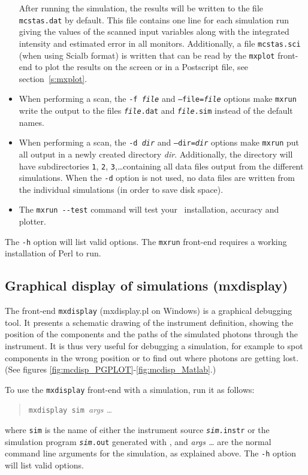 \begin{itemize}
After running the simulation, the results will be written to the file
\verb+mcstas.dat+ by default. This file contains one line for each
simulation run giving the values of the scanned input variables along
with the integrated intensity and estimated error in all monitors. Additionally, a
file \verb+mcstas.sci+ (when using Scialb format) is written that can be read by the \verb+mxplot+
front-end to plot the results on the screen or in a Postscript file, see
section~\ref{s:mxplot}. 
\item When performing a scan, the \texttt{-f \textit{file}} and
  \texttt{--file=\textit{file}} options make \verb+mxrun+ write the output
  to the files \texttt{\textit{file\/}.dat} and \texttt{\textit{file\/}.sim}
  instead of the default names.
\item When performing a scan, the \texttt{-d \textit{dir}} and
  \texttt{--dir=\textit{dir}} options make \verb+mxrun+ put all output in a
  newly created directory \textit{dir}. Additionally, the directory will
  have subdirectories \verb+1+, \verb+2+, \verb+3+,\ldots containing all
  data files output from the different simulations. When the \verb+-d+
  option is not used, no data files are written from the individual
  simulations (in order to save disk space).
\item The \verb+mxrun --test+ command will test your \MCX\ installation, accuracy and plotter. 
\end{itemize}

The \verb+-h+ option will list valid options. The \verb+mxrun+ front-end requires a working installation of Perl to run.


\subsection{Graphical display of simulations (mxdisplay)}
\label{s:mxdisplay}

The front-end \verb+mxdisplay+ (mxdisplay.pl on Windows) is a graphical debugging tool.
It presents a schematic drawing of the instrument
definition, showing the position of the components and the paths of the
simulated photons through the instrument. It is thus very useful for
debugging a simulation, for example to spot components in the wrong
position or to find out where photons are getting lost.
(See figures \ref{fig:mcdisp_PGPLOT}-\ref{fig:mcdisp_Matlab}.)

To use the \verb+mxdisplay+ front-end with a simulation, run it as
follows:
\begin{quote}
  \verb+mxdisplay sim +\textit{args \ldots}
\end{quote}
where \verb+sim+ is the name of either the instrument source \texttt{\textit{sim}.instr} or the simulation program \texttt{\textit{sim}.out} generated with
\MCX, and \textit{args \ldots} are the normal command line arguments for
the simulation, as explained above. The \verb+-h+ option will list valid options.

